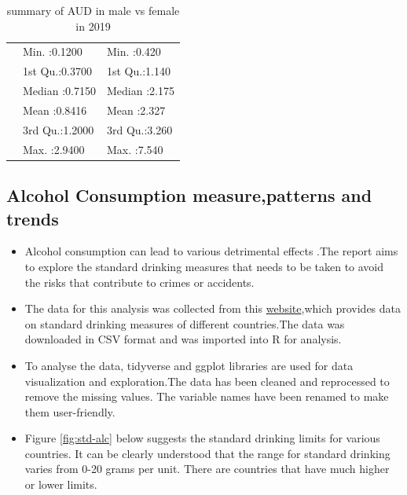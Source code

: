 \documentclass[11pt,a4paper,]{article}
\begin{document}
\begin{table}

\caption{\label{tab:alcoholSummary}summary of AUD in male vs female in 2019}
\centering
\begin{tabular}[t]{lll}
\toprule
\begingroup\fontsize{18}{20}\selectfont \cellcolor[HTML]{fae7b5}{\textcolor{black}{ }}\endgroup & \begingroup\fontsize{18}{20}\selectfont \cellcolor[HTML]{fae7b5}{\textcolor{black}{prevalence in female}}\endgroup & \begingroup\fontsize{18}{20}\selectfont \cellcolor[HTML]{fae7b5}{\textcolor{black}{prevalence in male}}\endgroup\\
\midrule
 & Min.   :0.1200 & Min.   :0.420\\
 & 1st Qu.:0.3700 & 1st Qu.:1.140\\
 & Median :0.7150 & Median :2.175\\
 & Mean   :0.8416 & Mean   :2.327\\
 & 3rd Qu.:1.2000 & 3rd Qu.:3.260\\
\addlinespace
 & Max.   :2.9400 & Max.   :7.540\\
\bottomrule
\end{tabular}
\end{table}

\subsection{Alcohol Consumption measure,patterns and trends}\label{alcohol-consumption-measurepatterns-and-trends}

\begin{itemize}
\item
  Alcohol consumption can lead to various detrimental effects .The report aims to explore the standard drinking measures that needs to be taken to avoid the risks that contribute to crimes or accidents.
\item
  The data for this analysis was collected from this \href{https://https://ourworldindata.org/alcohol-consumption\#what-is-a-standard-drink-measure}{website},which provides data on standard drinking measures of different countries.The data was downloaded in CSV format and was imported into R for analysis.
\item
  To analyse the data, tidyverse and ggplot libraries are used for data visualization and exploration.The data has been cleaned and reprocessed to remove the missing values. The variable names have been renamed to make them user-friendly.
\item
  Figure \ref{fig:std-alc} below suggests the standard drinking limits for various countries. It can be clearly understood that the range for standard drinking varies from 0-20 grams per unit. There are countries that have much higher or lower limits.
\end{itemize}
\end{document}

